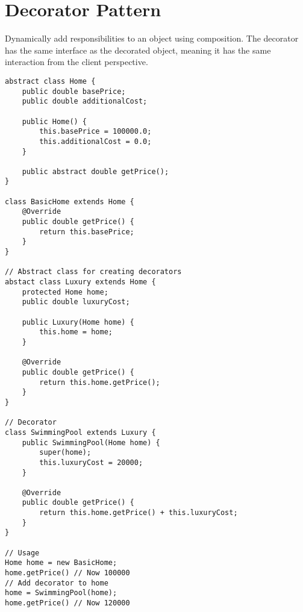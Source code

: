 \section{Decorator Pattern}
Dynamically add responsibilities to an object using composition. The decorator has the same interface as the decorated object, meaning it has the same interaction from the client perspective.

\begin{lstlisting}
abstract class Home {
    public double basePrice;
    public double additionalCost;
    
    public Home() {
        this.basePrice = 100000.0;
        this.additionalCost = 0.0;
    }

    public abstract double getPrice();
}

class BasicHome extends Home {
    @Override
    public double getPrice() {
        return this.basePrice;
    }
}

// Abstract class for creating decorators
abstact class Luxury extends Home {
    protected Home home;
    public double luxuryCost;

    public Luxury(Home home) {
        this.home = home;
    }

    @Override
    public double getPrice() {
        return this.home.getPrice();
    }
}

// Decorator
class SwimmingPool extends Luxury {
    public SwimmingPool(Home home) {
        super(home);
        this.luxuryCost = 20000;
    }

    @Override
    public double getPrice() {
        return this.home.getPrice() + this.luxuryCost;
    }
}

// Usage
Home home = new BasicHome;
home.getPrice() // Now 100000
// Add decorator to home
home = SwimmingPool(home);
home.getPrice() // Now 120000
\end{lstlisting}